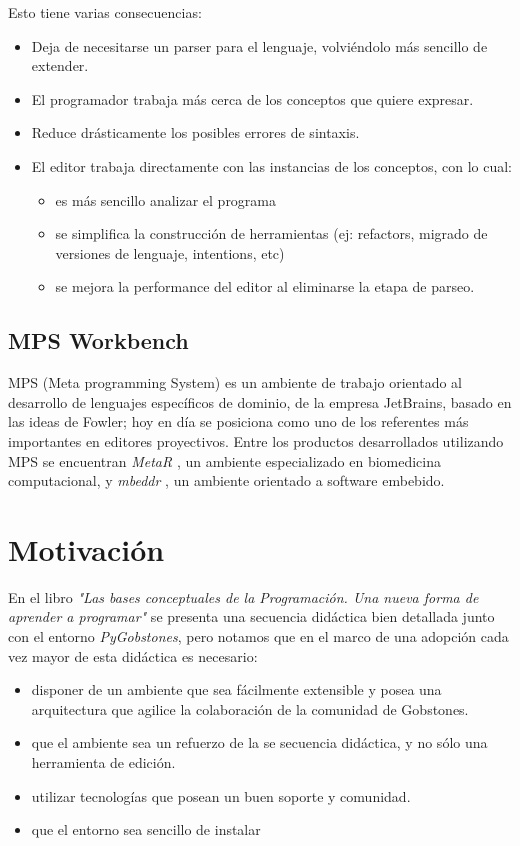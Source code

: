 Esto tiene varias consecuencias:
\begin{itemize}
  \item Deja de necesitarse un parser para el lenguaje, volviéndolo más sencillo de extender.
  \item El programador trabaja más cerca de los conceptos que quiere expresar.
  \item Reduce drásticamente los posibles errores de sintaxis.
  \item El editor trabaja directamente con las instancias de los conceptos, con lo cual:
  \begin{itemize}
    \item es más sencillo analizar el programa
    \item se simplifica la construcción de herramientas (ej: refactors, migrado de versiones de lenguaje, intentions, etc)
    \item se mejora la performance del editor al eliminarse la etapa de parseo.
  \end{itemize}
\end{itemize}


\subsection{MPS Workbench}

MPS (Meta programming System)\cite{MPS} es un ambiente de trabajo orientado al desarrollo de lenguajes específicos de dominio, de la empresa JetBrains, basado en las ideas de Fowler; hoy en día se posiciona como uno de los referentes más importantes en editores proyectivos\cite{LanguageModularity}. 
Entre los productos desarrollados utilizando MPS se encuentran \textit{MetaR} \cite{MetaR}, un ambiente especializado en biomedicina computacional, y \textit{mbeddr} \cite{mbeddr}, un ambiente orientado a software embebido.

\section{Motivación}

En el libro \textit{"Las bases conceptuales de la Programación. Una nueva forma de aprender a programar"}\cite{Gobstones} se presenta una secuencia didáctica bien detallada junto con el entorno \textit{PyGobstones}\cite{PyGobstones}, pero notamos que en el marco de una adopción cada vez mayor de esta didáctica es necesario:

\begin{itemize}
  \item disponer de un ambiente que sea fácilmente extensible y posea una arquitectura que agilice la colaboración de la comunidad de Gobstones.
  \item que el ambiente sea un refuerzo de la se secuencia didáctica, y no sólo una herramienta de edición.
  \item utilizar tecnologías que posean un buen soporte y comunidad.
  \item que el entorno sea sencillo de instalar
\end{itemize}


